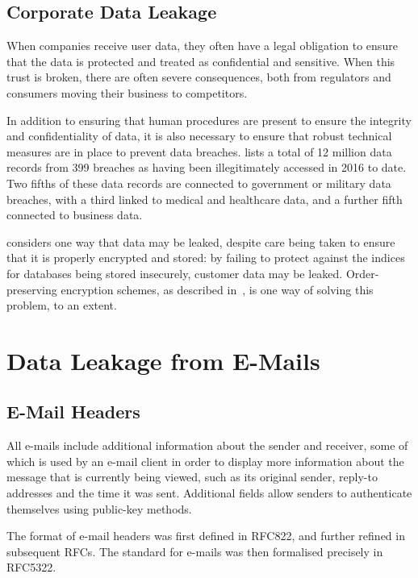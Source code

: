 \subsection{Corporate Data Leakage}

When companies receive user data, they often have a legal obligation to ensure
that the data is protected and treated as confidential and sensitive.  When
this trust is broken, there are often severe consequences, both from regulators
and consumers moving their business to competitors.

In addition to ensuring that human procedures are present to ensure the
integrity and confidentiality of data, it is also necessary to ensure that
robust technical measures are in place to prevent data breaches. 
\cite{2016_data_breach_category_summary_2016} lists a total of 12 million data
records from 399 breaches as having been illegitimately accessed in 2016 to date.
Two fifths of these data records are connected to government or military data breaches,
with a third linked to medical and healthcare data, and a further fifth connected
to business data.

\cite{squicciarini2010preventing} considers one way that data may be leaked,
despite care being taken to ensure that it is properly encrypted and stored: by
failing to protect against the indices for databases being stored insecurely,
customer data may be leaked.  Order-preserving encryption schemes, as described
in~\cite{agrawal2004order}, is one way of solving this problem, to an extent.

\section{Data Leakage from E-Mails}

\subsection{E-Mail Headers}

All e-mails include additional information about the sender and receiver, some
of which is used by an e-mail client in order to display more information about
the message that is currently being viewed, such as its original sender,
reply-to addresses and the time it was sent.  Additional fields allow senders
to authenticate themselves using public-key methods.

The format of e-mail headers was first defined in RFC822, and further refined
in subsequent RFCs.  The standard for e-mails was then formalised precisely in
RFC5322.

